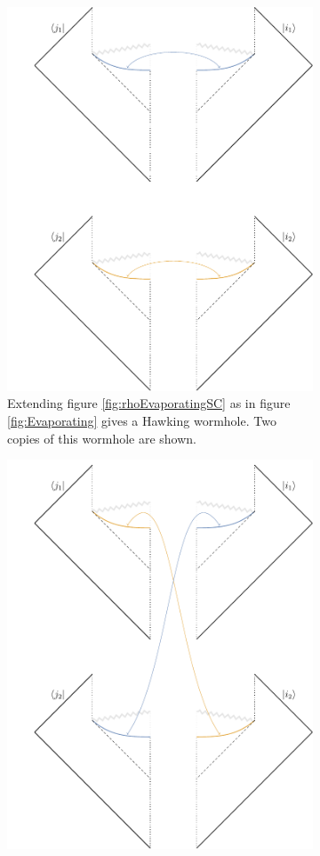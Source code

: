 \documentclass[letterpaper,12pt]{article}
\begin{document}
\begin{figure}
\centering
\begin{subfigure}[t]{.48\textwidth}\centering
	\includegraphics[width=.8\textwidth]{PSrho2A}
	\caption{Extending figure \ref{fig:rhoEvaporatingSC} as in figure \ref{fig:Evaporating} gives a Hawking wormhole. Two copies of this wormhole are shown.}
\label{fig:PSrho2a}
\end{subfigure}
\hfill
\begin{subfigure}[t]{.48\textwidth}\centering
	\includegraphics[width=.8\textwidth]{PSrho2B}

\end{subfigure}
\end{figure}
\end{document}
